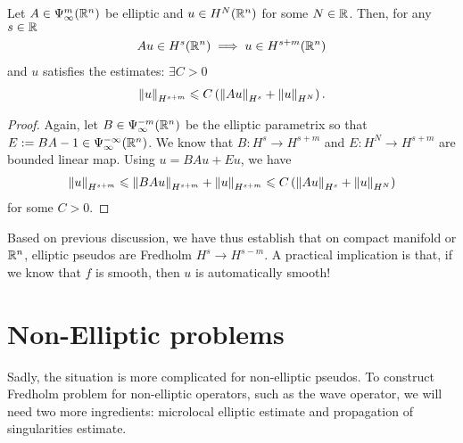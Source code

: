 \documentclass{article}
\begin{document}
\begin{fprop}
    Let $A \in \Psi^{m}_{\infty}(\R^n)$ be elliptic and $u \in H^{N}(\R^n)$ for some $N \in \R$. Then, for any $s \in \R$
    \begin{align*}
    Au \in H^{s}(\R^n) \implies u \in H^{s + m}(\R^n)
    \end{align*}
    and $u$ satisfies the estimates: $\exists C > 0$
    \begin{align*}
    \norm[u]_{H^{s + m}} \leq C \brac{\norm[Au]_{H^s} + \norm[u]_{H^N}}. 
    \end{align*}
\end{fprop}
\begin{proof}
    Again, let $B \in \Psi^{-m}_{\infty}(\R^n)$ be the elliptic parametrix so that $E := BA - 1 \in \Psi^{-\infty}_{\infty}(\R^n)$. We know that $B : H^{s} \to H^{s + m}$ and  $E : H^N \to H^{s + m}$ are bounded linear map. Using $u = BAu + Eu$, we have
    \begin{align*}
    \norm[u]_{H^{s + m}} \leq \norm[BAu]_{H^{s + m}} + \norm[u]_{H^{s + m}} \leq C \brac{\norm[Au]_{H^s} + \norm[u]_{H^N}}
    \end{align*}
    for some $C > 0$. 
\end{proof}


Based on previous discussion, we have thus establish that on compact manifold or $\R^n$, elliptic pseudos are Fredholm $H^{s} \to H^{s -m}$. A practical implication is that, if we know that $f$ is smooth, then $u$ is automatically smooth! 

\section{Non-Elliptic problems}
Sadly, the situation is more complicated for non-elliptic pseudos. To construct Fredholm problem for  non-elliptic operators, such as the wave operator, we will need two more ingredients: microlocal elliptic estimate and propagation of singularities estimate.

\\
 \\
\end{document}
